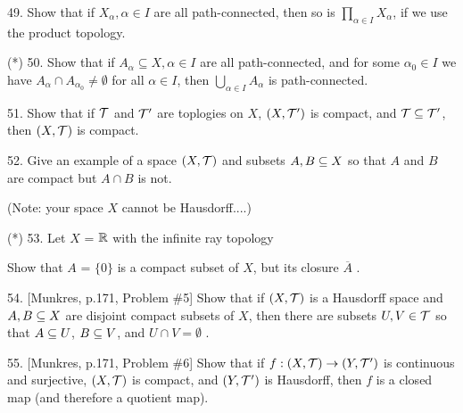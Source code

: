 \documentclass[12pt]{article}
\begin{document}
\begin{description}



\item{49.} Show that if $X_\alpha, \alpha\in I$ are all path-connected, then so is
$\prod_{\alpha\in I} X_\alpha$, if we use the product topology.

\msk

\item{(*)} 50. Show that if $A_\alpha\subseteq X, \alpha\in I$ are all path-connected, and
for some $\alpha_0\in I$ we have $\displaystyle A_\alpha\cap A_{\alpha_0}\neq\emptyset$ for all
$\alpha\in I$, then $\displaystyle\bigcup_{\alpha\in I}A_\alpha$ is path-connected.

\msk

\item{51.} Show that if ${\mathcal T}$ and ${\mathcal T}^\prime$ are toplogies on $X$,
$(X,{\mathcal T}^\prime)$ is compact, and ${\mathcal T}\subseteq{\mathcal T}^\prime$, then
$(X,{\mathcal T})$ is compact.


\msk

\item{52.} Give an example of a space $(X,{\mathcal T})$ and subsets $A,B\subseteq X$ so that
$A$ and $B$ are compact but $A\cap B$ is not.

\ssk

\item{\spc} (Note: your space $X$ cannot be Hausdorff....)


\msk

\item{(*)} 53. Let $X$ = ${\mathbb R}$ with the infinite ray topology 

\ssk


\ssk

\item{\spc} Show that $A$ = $\{0\}$ is a compact subset of $X$, but its closure $\overline{A}$ .


\msk

\item{54.} [Munkres, p.171, Problem \#5] 
Show that if $(X,{\mathcal T})$ is a Hausdorff space and $A,B\subseteq X$ are disjoint compact
subsets of $X$, then there are subsets $U,V\in {\mathcal T}$ so that $A\subseteq U$, $B\subseteq V$,
and $U\cap V =\emptyset$ .


\msk

\item{55.} [Munkres, p.171, Problem \#6] Show that if $f:(X,{\mathcal T})\rightarrow (Y,{\mathcal T}^\prime)$ is continuous and 
surjective, $(X,{\mathcal T})$ is compact, and $(Y,{\mathcal T}^\prime)$ is Hausdorff, then $f$ is a closed map (and
therefore a quotient map).



\end{description}
\end{document}
